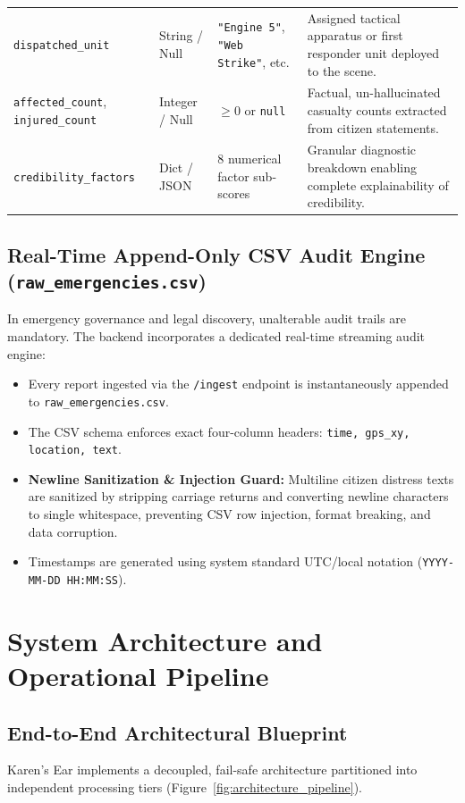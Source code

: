 \documentclass[10pt,a4paper]{article}
\begin{document}
\begin{table}[htbp]
\begin{tabularx}{\textwidth}{lp{2.1cm}p{4.3cm}X}
    \texttt{dispatched\_unit} & String / Null & \texttt{"Engine 5"}, \texttt{"Web Strike"}, etc. & Assigned tactical apparatus or first responder unit deployed to the scene. \\
    \texttt{affected\_count}, \texttt{injured\_count} & Integer / Null & $\ge 0$ or \texttt{null} & Factual, un-hallucinated casualty counts extracted from citizen statements. \\
    \texttt{credibility\_factors} & Dict / JSON & 8 numerical factor sub-scores & Granular diagnostic breakdown enabling complete explainability of credibility. \\
    \bottomrule
  \end{tabularx}
\end{table}

\subsection{Real-Time Append-Only CSV Audit Engine (\texttt{raw\_emergencies.csv})}
In emergency governance and legal discovery, unalterable audit trails are mandatory. The backend incorporates a dedicated real-time streaming audit engine:
\begin{itemize}
  \item Every report ingested via the \texttt{/ingest} endpoint is instantaneously appended to \texttt{raw\_emergencies.csv}.
  \item The CSV schema enforces exact four-column headers: \texttt{time, gps\_xy, location, text}.
  \item \textbf{Newline Sanitization \& Injection Guard:} Multiline citizen distress texts are sanitized by stripping carriage returns and converting newline characters to single whitespace, preventing CSV row injection, format breaking, and data corruption.
  \item Timestamps are generated using system standard UTC/local notation (\texttt{YYYY-MM-DD HH:MM:SS}).
\end{itemize}


\section{System Architecture and Operational Pipeline}
\subsection{End-to-End Architectural Blueprint}
Karen's Ear implements a decoupled, fail-safe architecture partitioned into independent processing tiers (Figure~\ref{fig:architecture_pipeline}).
\end{document}
